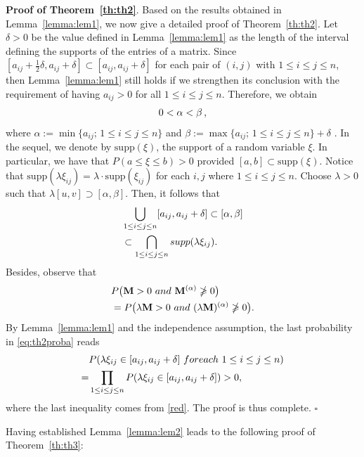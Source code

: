 \documentclass[conference,letterpaper]{IEEEtran}
\numberwithin{equation}{section}
\newcommand{\lbl}{\label}
\newcommand{\bea}{\begin{eqnarray}}
\newcommand{\eea}{\end{eqnarray}}
\begin{document}
\noindent\textbf{Proof of Theorem~\ref{th:th2}}. Based on the results obtained in Lemma~\ref{lemma:lem1}, we now give a detailed proof of Theorem~\ref{th:th2}. 
Let $\delta >0$ be the value defined in Lemma~\ref{lemma:lem1} as the length of the interval defining the supports of the entries of a matrix. 
Since $[a_{ij}+\frac{1}{2}\delta, a_{ij}+\delta] \subset [a_{ij}, a_{ij}+\delta]$  for each pair of $(i, j)$ with $1\leq i\leq j \leq n$, then Lemma~\ref{lemma:lem1} still holds if we strengthen its conclusion with the requirement of having $a_{ij}>0$ for all $1\leq i\leq j \leq n$.
Therefore, we obtain
\bea\lbl{poker}
0 < \alpha < \beta \, , \notag
\eea
where $\alpha:=\min\{a_{ij};\, 1\leq i\leq j \leq n\}$ and $\beta:=\max\{a_{ij};\, 1\leq i\leq j \leq n\}+\delta$ .
In the sequel, we denote by $\mbox{supp}(\xi)$, the support of a random variable $\xi$.
In particular, we have that $P(a\leq \xi\leq  b)>0$ provided $[a, b]\subset \mbox{supp}(\xi)$.
Notice that $\mbox{supp}(\lambda\xi_{ij})=\lambda\cdot \mbox{supp}(\xi_{ij})$ for each $i, j$ where $1\leq i\leq j \leq n$. 
Choose $\lambda>0$ such that $\lambda [u, v]\supset [\alpha , \beta]$. 
Then, it follows that
\bea\lbl{red}
& \bigcup_{1\leq i\leq  j\leq n}[a_{ij}, a_{ij}+\delta] \subset [\alpha, \beta]\\\notag
& \subset \bigcap_{1\leq i\leq  j\leq n}  \mbox{supp}(\lambda\xi_{ij}).\notag
\eea
Besides, observe that
\bea\label{eq:th2proba}
& P\big(\mathbf{M}>0\ \mbox{and}\ \mathbf{M}^{(\alpha)}\ngeqslant 0\big)\\\notag
& = P\big(\lambda\mathbf{M}>0\ \mbox{and}\ (\lambda\mathbf{M})^{(\alpha)}\ngeqslant 0\big).\notag
\eea
By Lemma~\ref{lemma:lem1} and the independence assumption, the last probability in \eqref{eq:th2proba} reads
\begin{align}\notag
& P(\lambda \xi_{ij}\in [a_{ij}, a_{ij}+\delta]\ \mbox{for each}\ 1\leq i\leq j \leq n)\\\notag
=& \prod_{1\leq i\leq j \leq n}P(\lambda\xi_{ij}\in [a_{ij}, a_{ij}+\delta])>0,\notag
\end{align}
where the last inequality comes from \eqref{red}. 
The proof is thus complete. \hfill$\square$

\medskip



Having established Lemma~\ref{lemma:lem2} leads to the following proof of Theorem~\ref{th:th3}:
\end{document}
